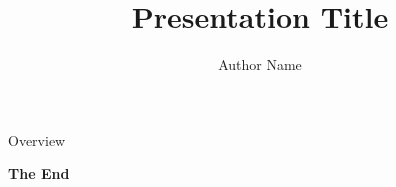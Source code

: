 \documentclass[aspectratio=169,xcolor=dvipsnames]{beamer}
\title{Presentation Title}
\author{Author Name}
\institute
{
    Author Title\\
    Institution%
}
\begin{document}
\begin{frame}
    \titlepage
\end{frame}


\begin{frame}{Overview}
    \tableofcontents
\end{frame}




%     
%     


\begin{frame}
    \Huge{\centerline{\textbf{The End}}}
\end{frame}

\end{document}
